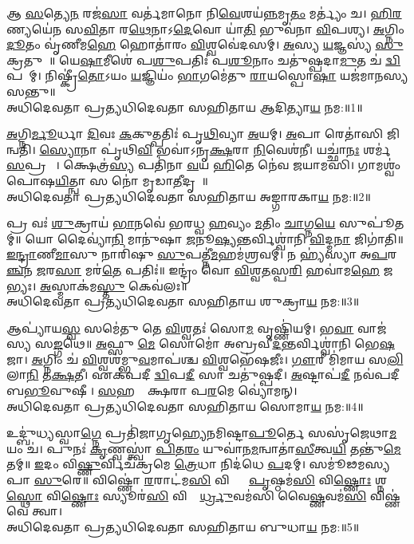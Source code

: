 

𑌆 \ul{𑌸}𑌤𑍍𑌯𑍇\ul{𑌨} 𑌰𑌜॑\ul{𑌸𑌾} 𑌵𑌰𑍍𑌤॑𑌮𑌾𑌨𑍋 𑌨𑌿\ul{𑌵𑍇}𑌶𑌯॑\ul{𑌨𑍍𑌨}𑌮𑍃\ul{𑌤𑌂} 𑌮𑌰𑍍𑌤𑍍𑌯𑌂॑ 𑌚। \ul{𑌹𑌿}\ul{𑌰}𑌣𑍍𑌯𑌯𑍇॑𑌨 𑌸\ul{𑌵𑌿}𑌤𑌾 𑌰\ul{𑌥𑍇}𑌨𑌾𑌽\ul{𑌦𑍇}𑌵𑍋 𑌯𑌾॑\ul{𑌤𑌿} 𑌭𑍁𑌵॑𑌨𑌾 \ul{𑌵𑌿}𑌪𑌶𑍍𑌯\sn{}। \ul{𑌅}𑌗𑍍𑌨𑌿𑌂 \ul{𑌦𑍂}𑌤𑌂 𑌵𑍃॑𑌣𑍀𑌮\ul{𑌹𑍇} 𑌹𑍋𑌤𑌾॑𑌰𑌂 \ul{𑌵𑌿}𑌶𑍍𑌵𑌵𑍇॑𑌦𑌸𑌮𑍍। \ul{𑌅}𑌸𑍍𑌯 \ul{𑌯}𑌜𑍍𑌞𑌸𑍍𑌯॑ \ul{𑌸𑍁}𑌕𑍍𑌰𑌤𑍁𑌮𑍍᳚॥ 𑌯𑍇\ul{𑌷𑌾}𑌮𑍀𑌶𑍇॑ 𑌪\ul{𑌶𑍁}𑌪𑌤𑌿𑌃॑ 𑌪\ul{𑌶𑍂}𑌨𑌾𑌂 𑌚𑌤𑍁॑𑌷𑍍𑌪𑌦𑌾\ul{𑌮𑍁}𑌤 𑌚॑ \ul{𑌦𑍍𑌵𑌿}𑌪𑌦𑌾᳚𑌮𑍍। 𑌨𑌿𑌷𑍍𑌕𑍍𑌰𑍀॑\ul{𑌤𑍋}𑌽𑌯𑌂 \ul{𑌯}𑌜𑍍𑌞𑌿𑌯𑌂॑ \ul{𑌭𑌾}𑌗𑌮𑍇॑𑌤𑍁 \ul{𑌰𑌾}𑌯𑌸𑍍𑌪𑍋\ul{𑌷𑌾} 𑌯𑌜॑𑌮𑌾𑌨𑌸𑍍𑌯 𑌸𑌨𑍍𑌤𑍁॥ \\
𑌅𑌧𑌿𑌦𑍇𑌵𑌤𑌾 𑌪𑍍𑌰𑌤𑍍𑌯𑌧𑌿𑌦𑍇𑌵𑌤𑌾 𑌸𑌹𑌿𑌤𑌾𑌯 𑌆𑌦𑌿𑌤𑍍𑌯𑌾\ul{𑌯} 𑌨𑌮:॥1॥ 

\ul{𑌅}𑌗𑍍𑌨𑌿\ul{𑌰𑍍𑌮𑍂}𑌰𑍍𑌧𑌾 \ul{𑌦𑌿}𑌵𑌃 \ul{𑌕}𑌕𑍁𑌤𑍍𑌪𑌤𑌿𑌃॑ 𑌪𑍃\ul{𑌥𑌿}𑌵𑍍𑌯𑌾 \ul{𑌅}𑌯𑌮𑍍। \ul{𑌅}𑌪𑌾 𑌰𑍇𑌤𑌾॑𑌸𑌿 𑌜𑌿𑌨𑍍𑌵𑌤𑌿। \ul{𑌸𑍍𑌯𑍋}𑌨𑌾 𑌪𑍃॑𑌥𑌿\ul{𑌵𑌿} 𑌭𑌵𑌾॑𑌽𑌨𑍃\ul{𑌕𑍍𑌷}𑌰𑌾 \ul{𑌨𑌿}𑌵𑍇𑌶॑𑌨𑍀। 𑌯𑌚𑍍𑌛𑌾॑\ul{𑌨𑌃} 𑌶𑌰𑍍𑌮॑ \ul{𑌸}𑌪𑍍𑌰𑌥𑌾𑌃᳚। 𑌕𑍍𑌷𑍇𑌤𑍍𑌰॑\ul{𑌸𑍍𑌯} 𑌪𑌤𑌿॑𑌨𑌾 \ul{𑌵}𑌯 \ul{𑌹𑌿}𑌤𑍇 𑌨𑍇॑𑌵 𑌜𑌯𑌾𑌮𑌸𑌿। 𑌗𑌾𑌮𑌶𑍍𑌵𑌂॑ 𑌪𑍋𑌷\ul{𑌯𑌿}𑌤𑍍𑌨𑍍𑌵𑌾 𑌸 𑌨𑍋॑ 𑌮𑍃𑌡𑌾\ul{𑌤𑍀}𑌦𑍃𑌶𑍇᳚॥ \\
𑌅𑌧𑌿𑌦𑍇𑌵𑌤𑌾 𑌪𑍍𑌰𑌤𑍍𑌯𑌧𑌿𑌦𑍇𑌵𑌤𑌾 𑌸𑌹𑌿𑌤𑌾𑌯 𑌅𑌙𑍍𑌗𑌾𑌰𑌕𑌾\ul{𑌯} 𑌨𑌮:॥2॥ 

𑌪𑍍𑌰 𑌵𑌃॑ \ul{𑌶𑍁}𑌕𑍍𑌰𑌾𑌯॑ \ul{𑌭𑌾}𑌨𑌵𑍇॑ 𑌭𑌰𑌧𑍍𑌵 \ul{𑌹}𑌵𑍍𑌯𑌂 \ul{𑌮}𑌤𑌿𑌂 \ul{𑌚𑌾}𑌗𑍍𑌨\ul{𑌯𑍇} 𑌸𑍁𑌪𑍂॑𑌤𑌮𑍍॥ 𑌯𑍋 𑌦𑍈𑌵𑍍𑌯𑌾॑\ul{𑌨𑌿} 𑌮𑌾𑌨𑍁॑𑌷𑌾 \ul{𑌜}𑌨𑍂\ul{𑌷𑍍𑌯}𑌨𑍍𑌤𑌰𑍍𑌵𑌿𑌶𑍍𑌵𑌾॑𑌨𑌿 \ul{𑌵𑌿}𑌦𑍍𑌮\ul{𑌨𑌾} 𑌜𑌿𑌗𑌾॑𑌤𑌿॥ \ul{𑌇}\ul{𑌨𑍍𑌦𑍍𑌰𑌾}𑌣𑍀\ul{𑌮𑌾}𑌸𑍁 𑌨𑌾𑌰𑌿॑𑌷𑍁 \ul{𑌸𑍁}𑌪𑌤𑍍𑌨𑍀॑\ul{𑌮}𑌹𑌮॑𑌶𑍍𑌰𑌵𑌮𑍍। 𑌨 𑌹𑍍𑌯॑𑌸𑍍𑌯𑌾 𑌅\ul{𑌪}𑌰\ul{𑌞𑍍𑌚}𑌨 \ul{𑌜}𑌰\ul{𑌸𑌾} 𑌮𑌰॑\ul{𑌤𑍇} 𑌪𑌤𑌿𑌃॑॥ 𑌇𑌨𑍍𑌦𑍍𑌰𑌂॑ 𑌵𑍋 \ul{𑌵𑌿}𑌶𑍍𑌵\ul{𑌤}𑌸𑍍𑌪\ul{𑌰𑌿} 𑌹𑌵𑌾॑𑌮\ul{𑌹𑍇} 𑌜𑌨𑍇᳚𑌭𑍍𑌯𑌃। \ul{𑌅}𑌸𑍍𑌮𑌾𑌕॑𑌮\ul{𑌸𑍍𑌤𑍁} 𑌕𑍇𑌵॑𑌲𑌃॥ \\
𑌅𑌧𑌿𑌦𑍇𑌵𑌤𑌾 𑌪𑍍𑌰𑌤𑍍𑌯𑌧𑌿𑌦𑍇𑌵𑌤𑌾 𑌸𑌹𑌿𑌤𑌾𑌯 𑌶𑍁𑌕𑍍𑌰𑌾\ul{𑌯} 𑌨𑌮:॥3॥ 

𑌆𑌪𑍍𑌯𑌾॑𑌯\ul{𑌸𑍍𑌵} 𑌸𑌮𑍇॑𑌤𑍁 𑌤𑍇 \ul{𑌵𑌿}𑌶𑍍𑌵𑌤𑌃॑ 𑌸𑍋\ul{𑌮} 𑌵𑍃𑌷𑍍𑌣𑌿॑𑌯𑌮𑍍। 𑌭\ul{𑌵𑌾} 𑌵𑌾𑌜॑𑌸𑍍𑌯 𑌸\ul{𑌙𑍍𑌗}𑌥𑍇॥ \ul{𑌅}𑌫𑍍𑌸𑍁 \ul{𑌮𑍇} 𑌸𑍋𑌮𑍋॑ 𑌅𑌬𑍍𑌰𑌵𑍀\ul{𑌦}𑌨𑍍𑌤𑌰𑍍𑌵𑌿𑌶𑍍𑌵𑌾॑𑌨𑌿 𑌭𑍇\ul{𑌷}𑌜𑌾। \ul{𑌅}𑌗𑍍𑌨𑌿𑌂 𑌚॑ \ul{𑌵𑌿}𑌶𑍍𑌵𑌶॑𑌮𑍍𑌭𑍁\ul{𑌵}𑌮𑌾𑌪॑𑌶𑍍𑌚 \ul{𑌵𑌿}𑌶𑍍𑌵𑌭𑍇॑𑌷𑌜𑍀𑌃। \ul{𑌗𑍗}𑌰𑍀 𑌮𑌿॑𑌮𑌾𑌯 𑌸\ul{𑌲𑌿}𑌲𑌾\ul{𑌨𑌿} 𑌤\ul{𑌕𑍍𑌷}𑌤𑍀। 𑌏𑌕॑𑌪𑌦𑍀 \ul{𑌦𑍍𑌵𑌿}𑌪\ul{𑌦𑍀} 𑌸𑌾 𑌚𑌤𑍁॑𑌷𑍍𑌪𑌦𑍀। \ul{𑌅}𑌷𑍍𑌟𑌾𑌪॑\ul{𑌦𑍀} 𑌨𑌵॑𑌪𑌦𑍀 𑌬\ul{𑌭𑍂}𑌵𑍁𑌷𑍀। \ul{𑌸}𑌹𑌸𑍍𑌰𑌾᳚𑌕𑍍𑌷𑌰𑌾 𑌪\ul{𑌰}𑌮𑍇 𑌵𑍍𑌯𑍋॑𑌮𑌨𑍍। \\
𑌅𑌧𑌿𑌦𑍇𑌵𑌤𑌾 𑌪𑍍𑌰𑌤𑍍𑌯𑌧𑌿𑌦𑍇𑌵𑌤𑌾 𑌸𑌹𑌿𑌤𑌾𑌯 𑌸𑍋𑌮𑌾\ul{𑌯} 𑌨𑌮:॥4॥ 

𑌉𑌦𑍍𑌬𑍁॑𑌧𑍍𑌯𑌸𑍍𑌵𑌾\ul{𑌗𑍍𑌨𑍇} 𑌪𑍍𑌰𑌤𑌿॑𑌜𑌾𑌗𑍃𑌹𑍍𑌯𑍇𑌨𑌮𑌿𑌷𑍍𑌟𑌾\ul{𑌪𑍂}𑌰𑍍𑌤𑍇 𑌸𑌸𑍃॑𑌜𑍇𑌥𑌾\ul{𑌮}𑌯𑌂 𑌚॑। 𑌪𑍁𑌨𑌃॑ \ul{𑌕𑍃}𑌣𑍍𑌵𑌸𑍍𑌤𑍍𑌵𑌾॑ \ul{𑌪𑌿}𑌤\ul{𑌰𑌂} 𑌯𑍁𑌵𑌾॑𑌨\ul{𑌮}𑌨𑍍𑌵𑌾𑌤𑌾॑\ul{𑌸𑍀}𑌤𑍍𑌵\ul{𑌯𑌿} 𑌤𑌨𑍍𑌤𑍁॑\ul{𑌮𑍇}𑌤𑌮𑍍॥ \ul{𑌇}𑌦𑌂 𑌵𑌿\ul{𑌷𑍍𑌣𑍁}𑌰𑍍𑌵𑌿𑌚॑𑌕𑍍𑌰𑌮𑍇 \ul{𑌤𑍍𑌰𑍇}𑌧𑌾 𑌨𑌿𑌦॑𑌧𑍇 \ul{𑌪}𑌦𑌮𑍍। 𑌸𑌮𑍂॑𑌢𑌮𑌸𑍍𑌯𑌪𑌾 \ul{𑌸𑍁}𑌰𑍇॥ 𑌵𑌿𑌷𑍍𑌣𑍋॑ \ul{𑌰}𑌰𑌾𑌟॑𑌮\ul{𑌸𑌿} 𑌵𑌿𑌷𑍍𑌣𑍋𑌃᳚ \ul{𑌪𑍃}𑌷𑍍𑌠𑌮॑\ul{𑌸𑌿} 𑌵𑌿\ul{𑌷𑍍𑌣𑍋𑌃} 𑌶𑍍𑌨𑌪𑍍𑌤𑍍𑌰𑍇᳚\ul{𑌸𑍍𑌥𑍋} 𑌵𑌿\ul{𑌷𑍍𑌣𑍋𑌃} 𑌸𑍍𑌯𑍂𑌰॑\ul{𑌸𑌿} 𑌵𑌿𑌷𑍍𑌣𑍋᳚\ul{𑌰𑍍𑌧𑍍𑌰𑍁}𑌵𑌮॑𑌸𑌿 𑌵𑍈\ul{𑌷𑍍𑌣}𑌵𑌮॑\ul{𑌸𑌿} 𑌵𑌿𑌷𑍍𑌣॑𑌵𑍇 𑌤𑍍𑌵𑌾। \\
𑌅𑌧𑌿𑌦𑍇𑌵𑌤𑌾 𑌪𑍍𑌰𑌤𑍍𑌯𑌧𑌿𑌦𑍇𑌵𑌤𑌾 𑌸𑌹𑌿𑌤𑌾𑌯 𑌬𑍁𑌧𑌾\ul{𑌯} 𑌨𑌮:॥5॥ 

